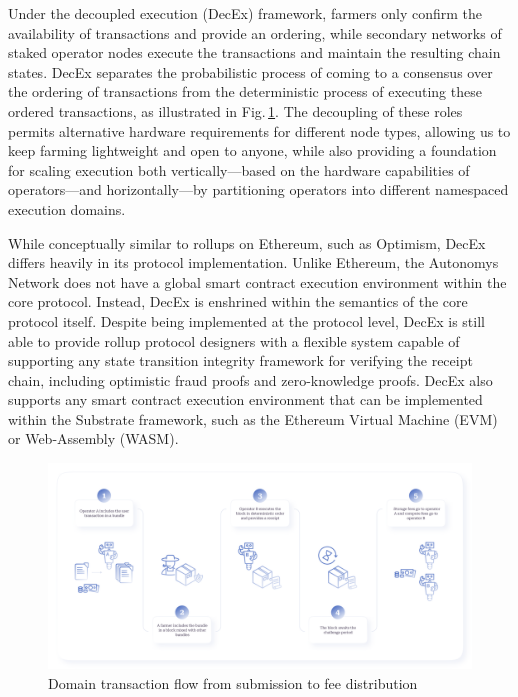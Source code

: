\documentclass[conference]{IEEEtran}
\begin{document}
Under the decoupled execution (DecEx) framework, farmers only confirm the availability of transactions and provide an ordering, while secondary networks of staked operator nodes execute the transactions and maintain the resulting chain states. DecEx separates the probabilistic process of coming to a consensus over the ordering of transactions from the deterministic process of executing these ordered transactions, as illustrated in Fig.\,\ref{fig:decex}. The decoupling of these roles permits alternative hardware requirements for different node types, allowing us to keep farming lightweight and open to anyone, while also providing a foundation for scaling execution both vertically—based on the hardware capabilities of operators—and horizontally—by partitioning operators into different namespaced execution domains.

While conceptually similar to rollups on Ethereum, such as Optimism, DecEx differs heavily in its protocol implementation. Unlike Ethereum, the Autonomys Network does not have a global smart contract execution environment within the core protocol. Instead, DecEx is enshrined within the semantics of the core protocol itself. Despite being implemented at the protocol level, DecEx is still able to provide rollup protocol designers with a flexible system capable of supporting any state transition integrity framework for verifying the receipt chain, including optimistic fraud proofs and zero-knowledge proofs. DecEx also supports any smart contract execution environment that can be implemented within the Substrate framework, such as the Ethereum Virtual Machine (EVM) or Web-Assembly (WASM).

\begin{figure}
    \centering
    \includegraphics[width=1\linewidth]{domain-flow.png}
\caption{Domain transaction flow from submission to fee distribution}
\label{fig:decex}
\end{figure}
\end{document}
